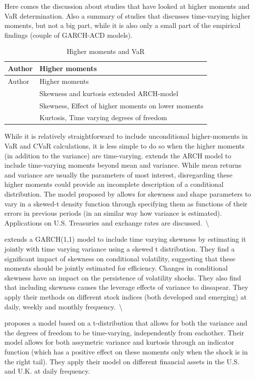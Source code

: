 \documentclass[a4paper, nobind]{templates/ociamthesis}
\begin{document}
Here comes the discussion about studies that have looked at higher moments and VaR determination. Also a summary of studies that discusses time-varying higher moments, but not a big part, while it is also only a small part of the empirical findings (couple of GARCH-ACD models).

\begin{longtable}[]{@{}ll@{}}
\caption{Higher moments and VaR}\tabularnewline
\toprule
Author & Higher moments\tabularnewline
\midrule
\endfirsthead
\toprule
Author & Higher moments\tabularnewline
\midrule
\endhead
\textcite{hansen1994} & Skewness and kurtosis extended ARCH-model\tabularnewline
\textcite{harvey1999} & Skewness, Effect of higher moments on lower moments\tabularnewline
\textcite{brooks2005} & Kurtosis, Time varying degrees of freedom\tabularnewline
\bottomrule
\end{longtable}

\noindent While it is relatively straightforward to include unconditional higher-moments in VaR and CVaR calculations, it is less simple to do so when the higher moments (in addition to the variance) are time-varying. \textcite{hansen1994} extends the ARCH model to include time-varying moments beyond mean and variance. While mean returns and variance are usually the parameters of most interest, disregarding these higher moments could provide an incomplete description of a conditional distribution. The model proposed by \textcite{hansen1994} allows for skewness and shape parameters to vary in a skewed-t density function through specifying them as functions of their errors in previous periods (in an similar way how variance is estimated). Applications on U.S. Treasuries and exchange rates are discussed.~\textbackslash{}

\noindent \textcite{harvey1999} extends a GARCH(1,1) model to include time varying skewness by estimating it jointly with time varying variance using a skewed t distribution. They find a significant impact of skewness on conditional volatility, suggesting that these moments should be jointly estimated for efficiency. Changes in conditional skewness have an impact on the persistence of volatility shocks. They also find that including skewness causes the leverage effects of variance to dissapear. They apply their methods on different stock indices (both developed and emerging) at daily, weekly and monthly frequency.~\textbackslash{}

\noindent \textcite{brooks2005} proposes a model based on a t-distribution that allows for both the variance and the degrees of freedom to be time-varying, independently from eachother. Their model allows for both assymetric variance and kurtosis through an indicator function (which has a positive effect on these moments only when the shock is in the right tail). They apply their model on different financial assets in the U.S. and U.K. at daily frequency.
\end{document}
